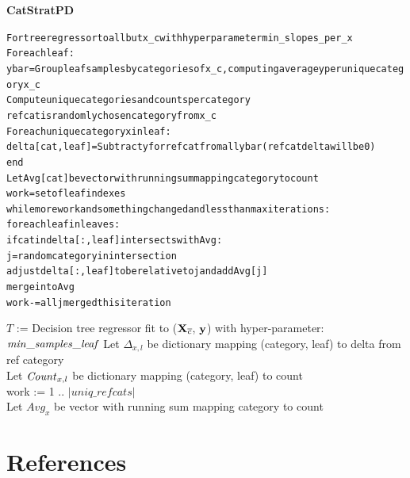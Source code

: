 \documentclass{article}
\newcommand{\xnc}{${\bf X}_{\overline{c}}$}
\begin{document}
\pagebreak

{\bf CatStratPD}\begin{alltt}\small
For tree regressor to all but x_c with hyper parameter min_slopes_per_x
For each leaf:
    y bar = Group leaf samples by categories of x_c, computing average y per unique category x_c
    Compute unique categories and counts per category
    refcat is randomly chosen category from x_c
    For each unique category x in leaf:
        delta[cat,leaf] = Subtract y for refcat from all y bar (refcat delta will be 0)
end
Let Avg[cat] be vector with running sum mapping category to count
work = set of leaf indexes
while more work and something changed and less than max iterations:
    for each leaf in leaves:
        if cat in delta[:,leaf] intersects with Avg:
            j = random category in intersection
            adjust delta[:,leaf] to be relative to j and add Avg[j]
            merge into Avg
    work -= all j merged this iteration
\end{alltt}

\setlength{\algomargin}{5pt}
\begin{algorithm}[]
\DontPrintSemicolon
{}
\SetAlgoSkip{}
$T$ := Decision tree regressor fit to (\xnc{}, $\bf y$) with hyper-parameter: ${\it min\_samples\_leaf}$\;
Let $\Delta_{x,l}$ be dictionary mapping (category, leaf) to delta from ref category\\
Let ${\it Count}_{x,l}$ be dictionary mapping (category, leaf) to count\\
work := 1 .. $|uniq\_refcats|$\\
Let $Avg_x$ be vector with running sum mapping category to count\\

\label{alg:CatStratPD}
\end{algorithm}

\section*{References}


\end{document}
